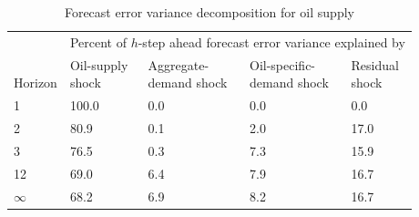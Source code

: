 \begin{table}

\caption{\label{tab:fevd-oilsupply} Forecast error variance decomposition for oil supply}
\centering
\begin{tabular}[t]{lllll}
\toprule
\multicolumn{1}{c}{ } & \multicolumn{4}{c}{Percent of $h$-step ahead forecast error variance explained by} \\
\cmidrule(l{3pt}r{3pt}){2-5}
\makecell[l]{\\Horizon} & \makecell[l]{Oil-supply\\shock} & \makecell[l]{Aggregate-\\demand shock} & \makecell[l]{Oil-specific-\\demand shock} & \makecell[l]{Residual\\shock}\\
\midrule
1 & 100.0 & 0.0 & 0.0 & 0.0\\
2 & 80.9 & 0.1 & 2.0 & 17.0\\
3 & 76.5 & 0.3 & 7.3 & 15.9\\
12 & 69.0 & 6.4 & 7.9 & 16.7\\
$\infty$ & 68.2 & 6.9 & 8.2 & 16.7\\
\bottomrule
\end{tabular}
\end{table}
